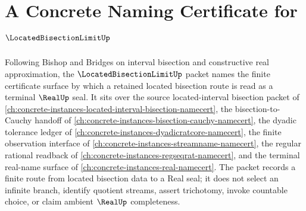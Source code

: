 \chapter{A Concrete Naming Certificate for $\LocatedBisectionLimitUp$}
\label{ch:concrete-instances-located-bisection-limit-namecert}

Following Bishop and Bridges on interval bisection and constructive real approximation, the $\LocatedBisectionLimitUp$ packet names the finite certificate surface by which a retained located bisection route is read as a terminal $\RealUp$ seal. It sits over the source located-interval bisection packet of \autoref{ch:concrete-instances-located-interval-bisection-namecert}, the bisection-to-Cauchy handoff of \autoref{ch:concrete-instances-bisection-cauchy-namecert}, the dyadic tolerance ledger of \autoref{ch:concrete-instances-dyadicratcore-namecert}, the finite observation interface of \autoref{ch:concrete-instances-streamname-namecert}, the regular rational readback of \autoref{ch:concrete-instances-regseqrat-namecert}, and the terminal real-name surface of \autoref{ch:concrete-instances-real-namecert}. The packet records a finite route from located bisection data to a Real seal; it does not select an infinite branch, identify quotient streams, assert trichotomy, invoke countable choice, or claim ambient $\RealUp$ completeness.

